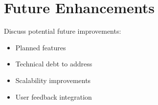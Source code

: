 \section{Future Enhancements}
Discuss potential future improvements:
\begin{itemize}
    \item Planned features
    \item Technical debt to address
    \item Scalability improvements
    \item User feedback integration
\end{itemize}